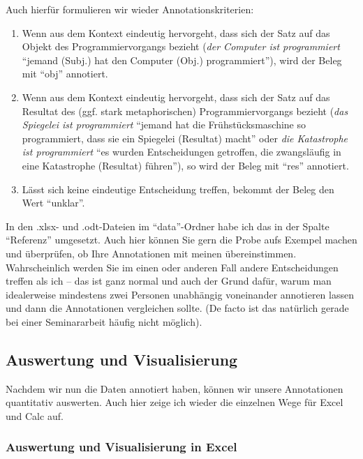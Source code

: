 \documentclass[]{article}
\begin{document}
Auch hierfür formulieren wir wieder Annotationskriterien:

\begin{enumerate}
\def\labelenumi{\arabic{enumi}.}
\item
  Wenn aus dem Kontext eindeutig hervorgeht, dass sich der Satz auf das
  Objekt des Programmiervorgangs bezieht (\emph{der Computer ist
  programmiert} \enquote{jemand (Subj.) hat den Computer (Obj.)
  programmiert}), wird der Beleg mit \enquote{obj} annotiert.
\item
  Wenn aus dem Kontext eindeutig hervorgeht, dass sich der Satz auf das
  Resultat des (ggf. stark metaphorischen) Programmiervorgangs bezieht
  (\emph{das Spiegelei ist programmiert} \enquote{jemand hat die
  Frühstücksmaschine so programmiert, dass sie ein Spiegelei (Resultat)
  macht} oder \emph{die Katastrophe ist programmiert} \enquote{es wurden
  Entscheidungen getroffen, die zwangsläufig in eine Katastrophe
  (Resultat) führen}), so wird der Beleg mit \enquote{res} annotiert.
\item
  Lässt sich keine eindeutige Entscheidung treffen, bekommt der Beleg
  den Wert \enquote{unklar}.
\end{enumerate}

In den .xlsx- und .odt-Dateien im \enquote{data}-Ordner habe ich das in
der Spalte \enquote{Referenz} umgesetzt. Auch hier können Sie gern die
Probe aufs Exempel machen und überprüfen, ob Ihre Annotationen mit
meinen übereinstimmen. Wahrscheinlich werden Sie im einen oder anderen
Fall andere Entscheidungen treffen als ich -- das ist ganz normal und
auch der Grund dafür, warum man idealerweise mindestens zwei Personen
unabhängig voneinander annotieren lassen und dann die Annotationen
vergleichen sollte. (De facto ist das natürlich gerade bei einer
Seminararbeit häufig nicht möglich).

\subsection{Auswertung und
Visualisierung}\label{auswertung-und-visualisierung}

Nachdem wir nun die Daten annotiert haben, können wir unsere
Annotationen quantitativ auswerten. Auch hier zeige ich wieder die
einzelnen Wege für Excel und Calc auf.

\subsubsection{Auswertung und Visualisierung in
Excel}\label{auswertung-und-visualisierung-in-excel}
\end{document}
